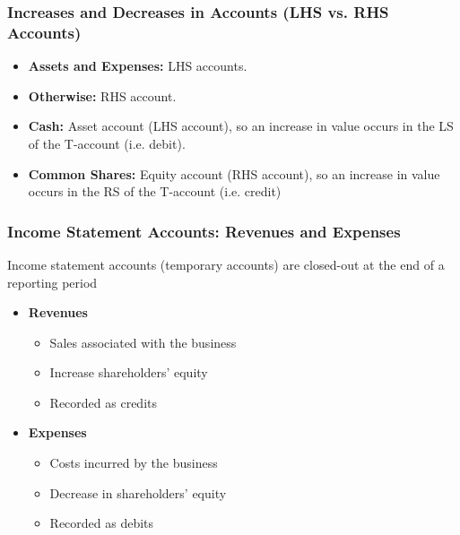 \subsubsection{Increases and Decreases in Accounts (LHS vs. RHS Accounts)}
\begin{definition}
    \begin{itemize}
        \item \textbf{Assets and Expenses:} LHS accounts. 
        \item \textbf{Otherwise:} RHS account.
    \end{itemize}
\end{definition}

\begin{example}
    \begin{itemize}
        \item \textbf{Cash:} Asset account (LHS account), so an increase in value occurs in the LS of the T-account (i.e. debit).
        \item \textbf{Common Shares:} Equity account (RHS account), so an increase in value occurs in the RS of the T-account (i.e. credit)
    \end{itemize}
\end{example}

\subsubsection{Income Statement Accounts: Revenues and Expenses}
\begin{definition}
    Income statement accounts (temporary accounts) are closed-out at the end of a reporting period
    \begin{itemize}
        \item \textbf{Revenues}
        \begin{itemize}
            \item Sales associated with the business
            \item Increase shareholders' equity
            \item Recorded as credits
        \end{itemize}
        \item \textbf{Expenses}
        \begin{itemize}
            \item Costs incurred by the business
            \item Decrease in shareholders' equity
            \item Recorded as debits
        \end{itemize}
    \end{itemize}
\end{definition}

